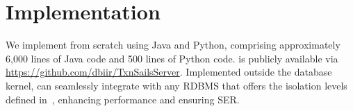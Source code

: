 \section{Implementation\label{implementation}}
We implement \sysname from scratch using Java and Python, comprising approximately 6,000 lines of Java code and 500 lines of Python code. \sysname is publicly available via \url{https://github.com/dbiir/TxnSailsServer}. Implemented outside the database kernel, \sysname can seamlessly integrate with any RDBMS that offers the isolation levels defined in~\cite{DBLP:conf/icde/AdyaLO00, DBLP:journals/pvldb/PortsG12}, enhancing performance and ensuring SER.




